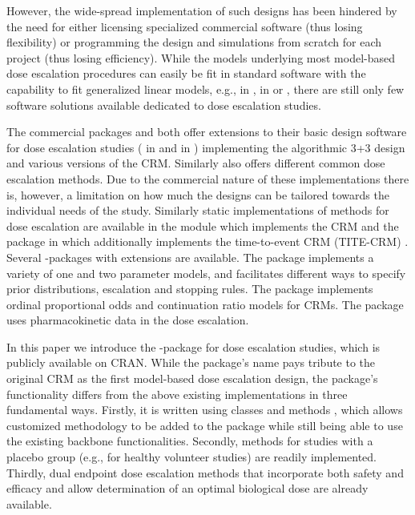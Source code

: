 \documentclass[article]{jss}\usepackage[]{graphicx}\usepackage[]{color}
\begin{document}
However, the wide-spread implementation of such designs has been hindered by the
need for either licensing specialized commercial software (thus losing
flexibility) or programming the design and simulations from scratch for each
project (thus losing efficiency). While the models underlying most model-based
dose escalation procedures can easily be fit in standard software with the
capability to fit generalized linear models, e.g.,  in
 \citep{SAS2003},  in  \citep{Stata2015} or  \citep{R2016}, 
there are still only few software solutions available dedicated to dose escalation studies.

The commercial packages  \citep{East2016} and
 \citep{Addplan2016} both offer extensions to their basic
design software for dose escalation studies ( in 
and  in ) implementing the algorithmic 3+3 design and
various versions of the CRM. Similarly  \citep{FACTS} also
offers different common dose escalation methods. Due to the commercial nature of
these implementations there is, however, a limitation on how much the designs
can be tailored towards the individual needs of the study. Similarly static
implementations of methods for dose escalation are available in the
 module  \citep{StataCRM} which implements the CRM and
the   package \citep{dfcrm2013} in  which additionally implements the
time-to-event CRM (TITE-CRM) \citep{cheung2000}. Several -packages 
with extensions are available. The  package \citep{sweeting2013} implements a variety of one and two parameter models, and facilitates different
ways to specify prior distributions, escalation and stopping rules. The  package
\citep{ordcrm} implements ordinal proportional odds and continuation ratio models for CRMs. 
The  package \citep{dfpk} uses pharmacokinetic data in the dose escalation.

In this paper we introduce the -package  \citep{crmPack} for
dose escalation studies, which is publicly available on CRAN. While the package's name
pays tribute to the original CRM as the first model-based dose escalation design, the 
package's functionality differs from the above existing implementations in
three fundamental ways. Firstly, it is written using  classes and methods
\citep{Chambers2008}, which allows customized methodology to be added to the
package while still being able to use the existing backbone functionalities.
Secondly, methods for studies with a placebo group (e.g., for healthy volunteer
studies) are readily implemented. Thirdly, dual endpoint dose escalation methods
that incorporate both safety and efficacy and allow determination of an optimal
biological dose are already available. 
\end{document}
